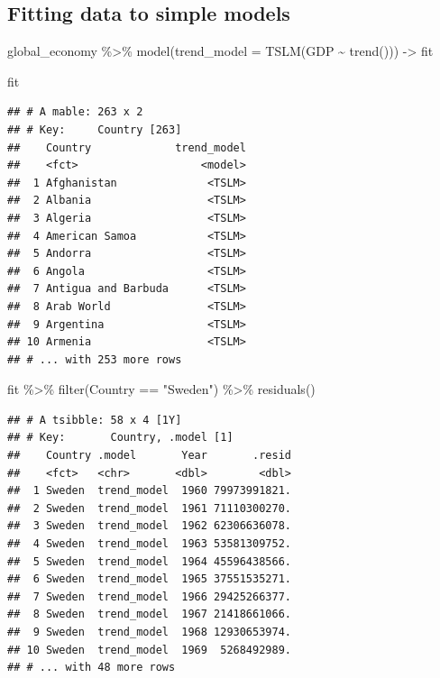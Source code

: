 \documentclass[
]{book}
\newenvironment{Shaded}{\begin{snugshade}}{\end{snugshade}}
\newcommand{\AttributeTok}[1]{\textcolor[rgb]{0.77,0.63,0.00}{#1}}
\newcommand{\FunctionTok}[1]{\textcolor[rgb]{0.00,0.00,0.00}{#1}}
\newcommand{\NormalTok}[1]{#1}
\newcommand{\OtherTok}[1]{\textcolor[rgb]{0.56,0.35,0.01}{#1}}
\newcommand{\SpecialCharTok}[1]{\textcolor[rgb]{0.00,0.00,0.00}{#1}}
\newcommand{\StringTok}[1]{\textcolor[rgb]{0.31,0.60,0.02}{#1}}
\begin{document}
\hypertarget{fitting-data-to-simple-models}{%
\subsection{Fitting data to simple models}\label{fitting-data-to-simple-models}}

\begin{Shaded}
\begin{Highlighting}[]
\NormalTok{global\_economy }\SpecialCharTok{\%\textgreater{}\%} \FunctionTok{model}\NormalTok{(}\AttributeTok{trend\_model =} \FunctionTok{TSLM}\NormalTok{(GDP }\SpecialCharTok{\textasciitilde{}} \FunctionTok{trend}\NormalTok{())) }\OtherTok{{-}\textgreater{}}\NormalTok{ fit}

\NormalTok{fit}
\end{Highlighting}
\end{Shaded}

\begin{verbatim}
## # A mable: 263 x 2
## # Key:     Country [263]
##    Country             trend_model
##    <fct>                   <model>
##  1 Afghanistan              <TSLM>
##  2 Albania                  <TSLM>
##  3 Algeria                  <TSLM>
##  4 American Samoa           <TSLM>
##  5 Andorra                  <TSLM>
##  6 Angola                   <TSLM>
##  7 Antigua and Barbuda      <TSLM>
##  8 Arab World               <TSLM>
##  9 Argentina                <TSLM>
## 10 Armenia                  <TSLM>
## # ... with 253 more rows
\end{verbatim}

\begin{Shaded}
\begin{Highlighting}[]
\NormalTok{fit }\SpecialCharTok{\%\textgreater{}\%} \FunctionTok{filter}\NormalTok{(Country }\SpecialCharTok{==} \StringTok{"Sweden"}\NormalTok{) }\SpecialCharTok{\%\textgreater{}\%} \FunctionTok{residuals}\NormalTok{()}
\end{Highlighting}
\end{Shaded}

\begin{verbatim}
## # A tsibble: 58 x 4 [1Y]
## # Key:       Country, .model [1]
##    Country .model       Year       .resid
##    <fct>   <chr>       <dbl>        <dbl>
##  1 Sweden  trend_model  1960 79973991821.
##  2 Sweden  trend_model  1961 71110300270.
##  3 Sweden  trend_model  1962 62306636078.
##  4 Sweden  trend_model  1963 53581309752.
##  5 Sweden  trend_model  1964 45596438566.
##  6 Sweden  trend_model  1965 37551535271.
##  7 Sweden  trend_model  1966 29425266377.
##  8 Sweden  trend_model  1967 21418661066.
##  9 Sweden  trend_model  1968 12930653974.
## 10 Sweden  trend_model  1969  5268492989.
## # ... with 48 more rows
\end{verbatim}
\end{document}
